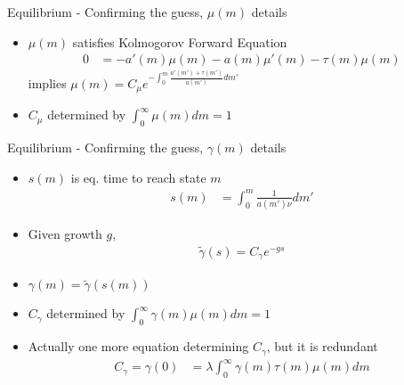 \documentclass[english,usenames,dvipsnames]{beamer}
\begin{document}
\begin{frame}[label = mu_details]{Equilibrium - Confirming the guess, $\mu(m)$ details}\hyperlink{confirming_bgp}{}
\begin{itemize}
	\item $\mu(m)$ satisfies Kolmogorov Forward Equation
	\begin{align*}
	0 &= - a'(m)\mu(m) - a(m) \mu'(m) - \tau(m) \mu(m)
	\end{align*}
	implies $\mu(m) = C_{\mu} e^{-\int_0^m \frac{a'(m') + \tau(m')}{a(m')} dm'}$
	\item $C_{\mu}$ determined by $\int_0^{\infty} \mu(m) dm = 1$
\end{itemize}
\end{frame}

\begin{frame}[label = gamma_details]{Equilibrium - Confirming the guess, $\gamma(m)$ details}\hyperlink{confirming_bgp}{}
\begin{itemize}
\item $s(m)$ is eq. time to reach state $m$
\begin{align*}
s(m) &= \int_0^{m} \frac{1}{a(m') \nu} dm'
\end{align*}
\item Given growth $g$, 
\begin{align*}
\tilde{\gamma}(s) = C_{\gamma} e^{-gs}
\end{align*}
\item $\gamma(m) = \tilde{\gamma}(s(m))$
\item $C_{\gamma}$ determined by $\int_0^{\infty} \gamma(m) \mu(m) dm = 1$
\footnotesize
\item Actually one more equation determining $C_{\gamma}$, but it is redundant
\begin{align*}
C_{\gamma} = \gamma(0) &= \lambda \int_0^{\infty} \gamma(m) \tau(m) \mu(m) dm
\end{align*}
\end{itemize}
\end{frame}
\end{document}
